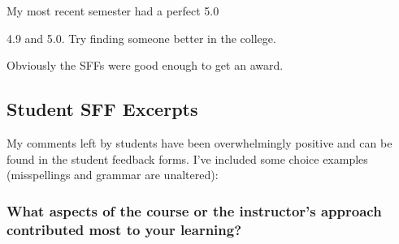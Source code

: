 \documentclass[]{article}
\begin{document}
My most recent semester had a perfect 5.0


4.9 and 5.0.  
Try finding someone better in the college.

Obviously the SFFs were good enough to get an award.

\subsection{Student SFF Excerpts}

My comments left by students have been overwhelmingly positive and can be found in the student feedback forms.
I've included some choice examples (misspellings and grammar are unaltered):

\subsubsection{What aspects of the course or the instructor’s approach contributed most to your learning?}
\end{document}
